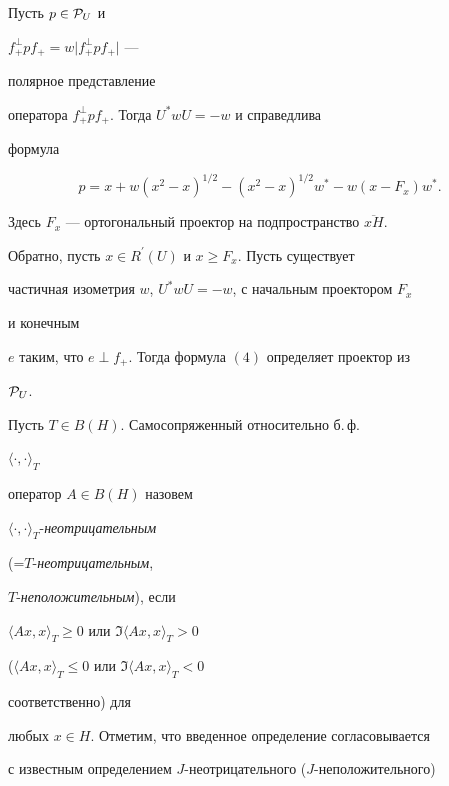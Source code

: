 \begin{prop}


Пусть $p\in {\cal P}_{U}$ и 


$f_{+}^{\perp}pf_{+}=w\vert f_{+}^{\perp}pf_{+}\vert$ ---


полярное представление


оператора $f^{\perp}_{+}pf_{+}$. Тогда $U^{*}wU=-w$ и справедлива


формула


\begin{equation}


p=x+w(x^{2}-x)^{1/2}-(x^{2}-x)^{1/2}w^{*}-w(x-F_{x})w^{*}.


\end{equation}


Здесь $F_{x}$ --- ортогональный проектор на подпространство $\overline{xH}$.





Обратно, пусть $x\in R^{\prime}(U)$ и $x\geq F_{x}$. Пусть существует


частичная изометрия $w$, $U^{*}wU=-w$, с начальным проектором $F_{x}$


и конечным


$e$ таким, что $e\perp f_{+}$. Тогда формула $(4)$ определяет проектор из


${\cal P}_{U}$.


\end{prop}





Пусть $T\in B(H)$. Самосопряженный относительно б.\,ф.


$\langle\cdot,\cdot \rangle_{T}$


оператор $A\in B(H)$ назовем


$\langle\cdot,\cdot \rangle_{T}$-{\it неотрицательным}


(=$T$-{\it неотрицательным},


$T$-{\it неположительным}), если


$\langle Ax,x\rangle_{T}\geq 0$ или $\Im\langle Ax,x\rangle_{T}>0$


($\langle Ax,x\rangle_{T}\leq 0$ или $\Im\langle Ax,x\rangle_{T}<0$


соответственно) для


любых $x\in H$. Отметим, что введенное определение согласовывается


с известным определением $J$-неотрицательного ($J$-неположительного)


